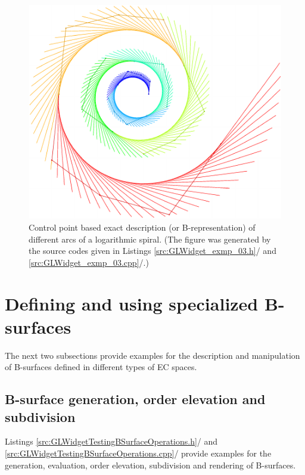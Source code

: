 \documentclass[b5paper, twosided]{book}
\DeclareRobustCommand{\mref}[1]{\ref{#1}{\relsize{-1}/\pageref{#1}}}
\begin{document}

\begin{figure}[!htb]
	\centering
	\includegraphics[]{images/logarithmic_spiral.pdf}
	\caption{Control point based exact description (or B-representation) of different arcs of a logarithmic spiral. (The figure was generated by the source codes given in Listings \mref{src:GLWidget_exmp_03.h} and \mref{src:GLWidget_exmp_03.cpp}.)}
	\label{fig:logarithmic_spiral}
\end{figure}

\section{Defining and using specialized B-surfaces}\label{sec:Defining_and_using_specialized_EC_B-surfaces}

The next two subsections provide examples for the description and manipulation of B-surfaces defined in different types of EC spaces.

\subsection{B-surface generation, order elevation and subdivision}\label{subsec:B-surface_generation_order_elevation_and_subdivision}

Listings \mref{src:GLWidgetTestingBSurfaceOperations.h} and \mref{src:GLWidgetTestingBSurfaceOperations.cpp} provide examples for the generation, evaluation, order elevation, subdivision and rendering of B-surfaces.
\end{document}
